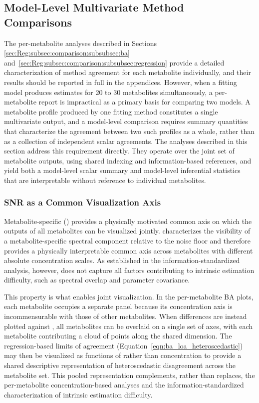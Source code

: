 \subsection{Model-Level Multivariate Method Comparisons}
\label{sec:Reg:subsec:comparison:subsubsec:model-level}
The per-metabolite analyses described in Sections \ref{sec:Reg:subsec:comparison:subsubsec:ba} and~\ref{sec:Reg:subsec:comparison:subsubsec:regression} provide a detailed characterization of method agreement for each metabolite individually, and their results should be reported in full in the appendices. However, when a fitting model produces estimates for 20 to 30 metabolites simultaneously, a per-metabolite report is impractical as a primary basis for comparing two models. A metabolite profile produced by one fitting method constitutes a single multivariate output, and a model-level comparison requires summary quantities that characterize the agreement between two such profiles as a whole, rather than as a collection of independent scalar agreements. The analyses described in this section address this requirement directly. They operate over the joint set of metabolite outputs, using shared indexing and information-based references, and yield both a model-level scalar summary and model-level inferential statistics that are interpretable without reference to individual metabolites.

\subsubsection{SNR as a Common Visualization Axis}
\label{subsubsec:snr_axis}
Metabolite-specific \SNR (\mSNR) provides a physically motivated common axis on which the outputs of all metabolites can be visualized jointly. \mSNR characterizes the visibility of a metabolite-specific spectral component relative to the noise floor and therefore provides a physically interpretable common axis across metabolites with different absolute concentration scales. As established in the information-standardized analysis, however, \mSNR does not capture all factors contributing to intrinsic estimation difficulty, such as spectral overlap and parameter covariance.

This property is what enables joint visualization. In the per-metabolite BA plots, each metabolite occupies a separate panel because its concentration axis is incommensurable with those of other metabolites. When differences are instead plotted against \mSNR, all metabolites can be overlaid on a single set of axes, with each metabolite contributing a cloud of points along the shared \SNR dimension. The regression-based limits of agreement (Equation~\ref{eqn:ba_loa_heteroscedastic}) may then be visualized as functions of \mSNR rather than concentration to provide a shared descriptive representation of heteroscedastic disagreement across the metabolite set. This pooled representation complements, rather than replaces, the per-metabolite concentration-based analyses and the information-standardized characterization of intrinsic estimation difficulty.

